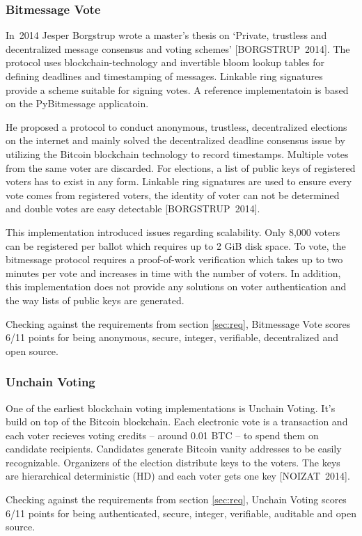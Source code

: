 \documentclass[9pt,oneside]{amsart}
\begin{document}
\begin{multicols}{2}
\subsubsection{Bitmessage Vote}
In~2014 Jesper Borgstrup wrote a master's thesis on \enquote*{Private, trustless and decentralized message consensus and voting schemes} [BORGSTRUP~2014]. The protocol uses blockchain-technology and invertible bloom lookup tables for defining deadlines and timestamping of messages. Linkable ring signatures provide a scheme suitable for signing votes. A reference implementatoin is based on the PyBitmessage applicatoin.\par
He proposed a protocol to conduct anonymous, trustless, decentralized elections on the internet and mainly solved the decentralized deadline consensus issue by utilizing the Bitcoin blockchain technology to record timestamps. Multiple votes from the same voter are discarded. For elections, a list of public keys of registered voters has to exist in any form. Linkable ring signatures are used to ensure every vote comes from registered voters, the identity of voter can not be determined and double votes are easy detectable [BORGSTRUP~2014].\par
This implementation introduced issues regarding scalability. Only 8,000 voters can be registered per ballot which requires up to 2 GiB disk space. To vote, the bitmessage protocol requires a proof-of-work verification which takes up to two minutes per vote and increases in time with the number of voters. In addition, this implementation does not provide any solutions on voter authentication and the way lists of public keys are generated.\par
Checking against the requirements from section \ref{sec:req}, Bitmessage Vote scores 6/11 points for being anonymous, secure, integer, verifiable, decentralized and open source.

\subsubsection{Unchain Voting}
One of the earliest blockchain voting implementations is Unchain Voting. It's build on top of the Bitcoin blockchain. Each electronic vote is a transaction and each voter recieves voting credits -- around 0.01 BTC -- to spend them on candidate recipients. Candidates generate Bitcoin vanity addresses to be easily recognizable. Organizers of the election distribute keys to the voters. The keys are hierarchical deterministic (HD) and each voter gets one key [NOIZAT~2014].\par
Checking against the requirements from section \ref{sec:req}, Unchain Voting scores 6/11 points for being authenticated, secure, integer, verifiable, auditable and open source.


\end{multicols}
\end{document}
